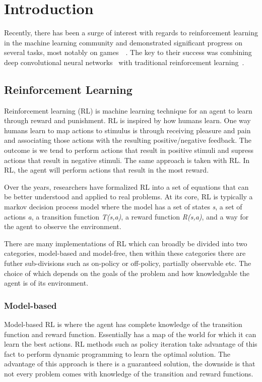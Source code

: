 \section{Introduction}
Recently, there has been a surge of interest with regards to reinforcement learning in the machine learning community and demonstrated significant progress on several tasks, most notably on games~\cite{mnih2015human}~\cite{silver2016mastering}. The key to their success was combining deep convolutional neural networks~\cite{krizhevsky2012imagenet} with traditional reinforcement learning~\cite{sutton1998reinforcement}.

\subsection{Reinforcement Learning}
Reinforcement learning (RL) is machine learning technique for an agent to learn through reward and punishment. RL is inspired by how humans learn. One way humans learn to map actions to stimulus is through receiving pleasure and pain and associating those actions with the resulting positive/negative feedback. The outcome is we tend to perform actions that result in positive stimuli and supress actions that result in negative stimuli. The same approach is taken with RL. In RL, the agent will perform actions that result in the most reward. 

Over the years, researchers have formalized RL into a set of equations that can be better understood and applied to real problems. At its core, RL is typically a markov decision process model where the model has a set of states \textit{s}, a set of actions \textit{a}, a transition function \textit{T(s,a)}, a reward function \textit{R(s,a)}, and a way for the agent to observe the environment.

There are many implementations of RL which can broadly be divided into two categories, model-based and model-free, then within these categories there are futher sub-divisions such as on-policy or off-policy, partially observable etc. The choice of which depends on the goals of the problem and how knowledgable the agent is of its environment.

\subsubsection{Model-based}
Model-based RL is where the agent has complete knowledge of the transition function and reward function. Essentially has a map of the world for which it can learn the best actions. RL methods such as policy iteration take advantage of this fact to perform dynamic programming to learn the optimal solution. The advantage of this approach is there is a guaranteed solution, the downside is that not every problem comes with knowledge of the transition and reward functions.

